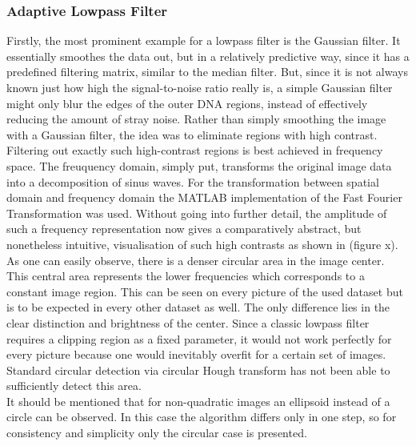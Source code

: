 \documentclass{article}
\begin{document}
\subsubsection{Adaptive Lowpass Filter}\label{sec:Adaptive Lowpass Filter}
Firstly, the most prominent example for a lowpass filter is the Gaussian filter. It essentially smoothes the data out, but in a relatively predictive way, since it has a predefined filtering matrix, similar to the median filter. But, since it is not always known just how high the signal-to-noise ratio really is, a simple Gaussian filter might only blur the edges of the outer DNA regions, instead of effectively reducing the amount of stray noise. Rather than simply smoothing the image with a Gaussian filter, the idea was to eliminate regions with high contrast.  \\
Filtering out exactly such high-contrast regions is best achieved in frequency space. The freuquency domain, simply put, transforms the original image data into a decomposition of sinus waves. For the transformation between spatial domain and frequency domain the MATLAB implementation of the Fast Fourier Transformation was used. Without going into further detail, the amplitude of such a frequency representation now gives a comparatively abstract, but nonetheless intuitive, visualisation of such high contrasts as shown in (figure x). \\
As one can easily observe, there is a denser circular area in the image center. This central area represents the lower frequencies which corresponds to a constant image region. This can be seen on every picture of the used dataset but is to be expected in every other dataset as well. The only difference lies in the clear distinction and brightness of the center. Since a classic lowpass filter requires a clipping region as a fixed parameter, it would not work perfectly for every picture because one would inevitably overfit for a certain set of images. Standard circular detection via circular Hough transform has not been able to sufficiently detect this area. \\
It should be mentioned that for non-quadratic images an ellipsoid instead of a circle can be observed. In this case the algorithm differs only in one step, so for consistency and simplicity only the circular case is presented. \\
\end{document}
